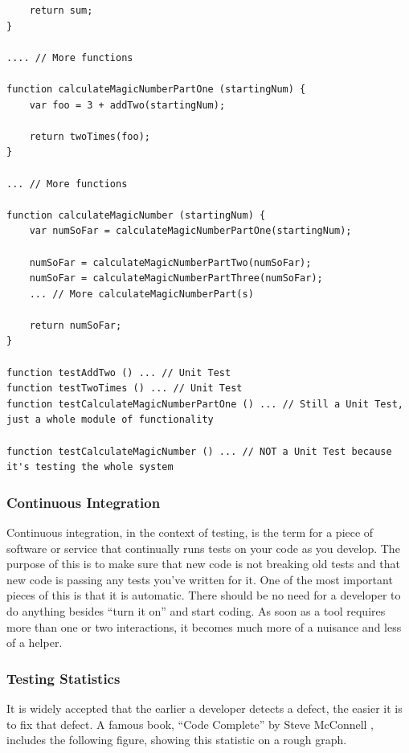 \documentclass[11pt]{article}
\begin{document}
\begin{multicols}{2}
\begin{lstlisting}
	return sum;
}

.... // More functions

function calculateMagicNumberPartOne (startingNum) {
	var foo = 3 + addTwo(startingNum);

	return twoTimes(foo);
}

... // More functions

function calculateMagicNumber (startingNum) {
	var numSoFar = calculateMagicNumberPartOne(startingNum);

	numSoFar = calculateMagicNumberPartTwo(numSoFar);
	numSoFar = calculateMagicNumberPartThree(numSoFar);
	... // More calculateMagicNumberPart(s)

	return numSoFar;
}

function testAddTwo () ... // Unit Test
function testTwoTimes () ... // Unit Test
function testCalculateMagicNumberPartOne () ... // Still a Unit Test, just a whole module of functionality

function testCalculateMagicNumber () ... // NOT a Unit Test because it's testing the whole system
\end{lstlisting}

\subsubsection{Continuous Integration}
Continuous integration, in the context of testing, is the term for a piece of software or service that continually runs tests on your code as you develop. The purpose of this is to make sure that new code is not breaking old tests and that new code is passing any tests you've written for it.
One of the most important pieces of this is that it is automatic. There should be no need for a developer to do anything besides ``turn it on'' and start coding. As soon as a tool requires more than one or two interactions, it becomes much more of a nuisance and less of a helper.

\subsubsection{Testing Statistics}
It is widely accepted that the earlier a developer detects a defect, the easier it is to fix that defect. A famous book, ``Code Complete'' by Steve McConnell \cite{DefectPic}, includes the following figure, showing this statistic on a rough graph.


\end{multicols}
\end{document}
